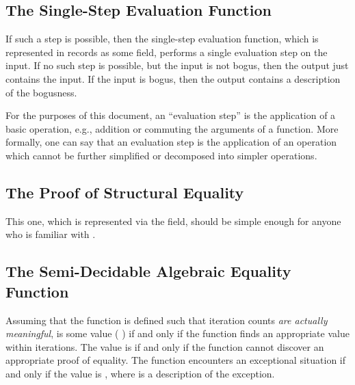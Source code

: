 \documentclass{report}
\begin{document}
\subsection{The Single-Step Evaluation Function}
If such a step is possible, then the single-step evaluation function, which is represented in  records as some  field, performs a single evaluation step on the input.  If no such step is possible, but the input is not bogus, then the output just contains the input.  If the input is bogus, then the output contains a description of the bogusness.

For the purposes of this document, an ``evaluation step'' is the application of a basic operation, e.g., addition or commuting the arguments of a function.  More formally, one can say that an evaluation step is the application of an operation which cannot be further simplified or decomposed into simpler operations.

\subsection{The Proof of Structural Equality}
This one, which is represented via the  field, should be simple enough for anyone who is familiar with .

\subsection{The Semi-Decidable Algebraic Equality Function}
Assuming that the function is defined such that iteration counts \emph{are actually meaningful},      is some value  \AgdaSymbol( \AgdaSymbol) if and only if the  function finds an appropriate value within  iterations.  The  value is   if and only if the function cannot discover an appropriate proof of equality.  The function encounters an exceptional situation if and only if the  value is  , where  is a description of the exception.
\end{document}

